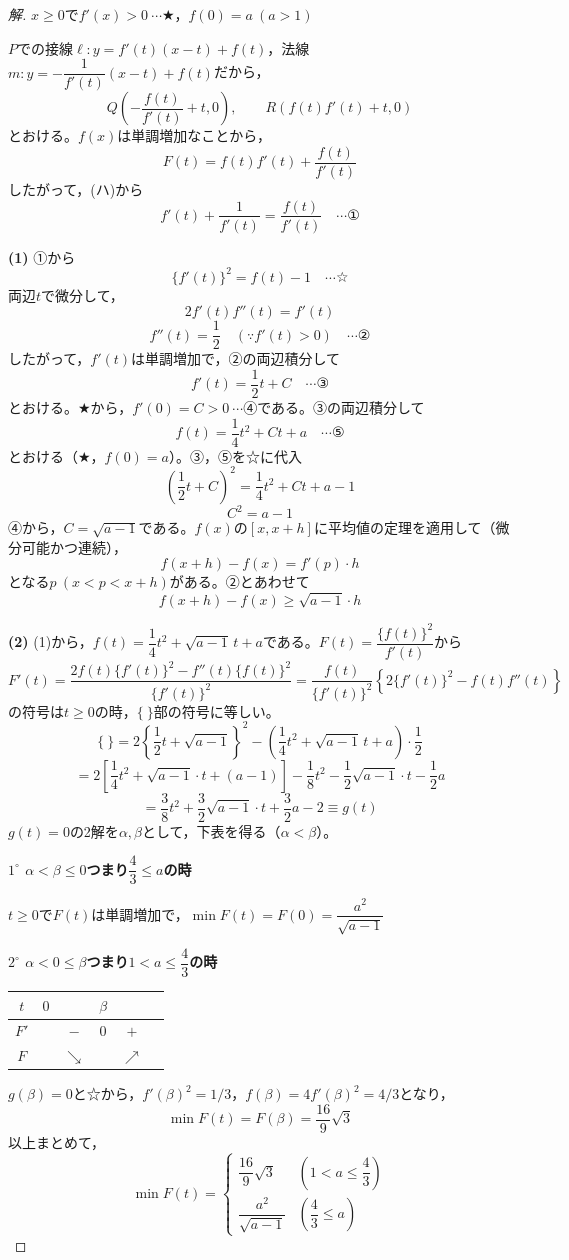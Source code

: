 \documentclass[../main.tex]{subfiles}
\begin{document}
\begin{proof}[解]
  $x\ge0$で$f'(x)>0\ \cdots\bigstar$，$f(0)=a\ (a>1)$

  $P$での接線$\ell: y=f'(t)(x-t)+f(t)$，法線$m: y=-\dfrac1{f'(t)}(x-t)+f(t)$だから，
  \[
    Q\left(-\frac{f(t)}{f'(t)}+t,0\right), \qquad R(f(t)f'(t)+t,0)
  \]
  とおける。$f(x)$は単調増加なことから，
  \[
    F(t)=f(t)f'(t)+\frac{f(t)}{f'(t)}
  \]
  したがって，(ハ)から
  \[
    f'(t)+\frac1{f'(t)}=\frac{f(t)}{f'(t)} \quad\cdots\text{①}
  \]

  \textbf{(1)} ①から
  \[
    \{f'(t)\}^2=f(t)-1 \quad\cdots\text{☆}
  \]
  両辺$t$で微分して，
  \[
    2f'(t)f''(t)=f'(t)
  \]
  \[
    f''(t)=\frac12 \quad(\because f'(t)>0) \quad\cdots\text{②}
  \]
  したがって，$f'(t)$は単調増加で，②の両辺積分して
  \[
    f'(t)=\frac12t+C \quad\cdots\text{③}
  \]
  とおける。$\bigstar$から，$f'(0)=C>0\ \cdots$④である。③の両辺積分して
  \[
    f(t)=\frac14t^2+Ct+a \quad\cdots\text{⑤}
  \]
  とおける（$\bigstar$，$f(0)=a$）。③，⑤を☆に代入
  \[
    \left(\frac12t+C\right)^2=\frac14t^2+Ct+a-1
  \]
  \[
    C^2=a-1
  \]
  ④から，$C=\sqrt{a-1}$である。$f(x)$の$[x,x+h]$に平均値の定理を適用して（微分可能かつ連続），
  \[
    f(x+h)-f(x)=f'(p)\cdot h
  \]
  となる$p\ (x<p<x+h)$がある。②とあわせて
  \[
    f(x+h)-f(x)\ge\sqrt{a-1}\cdot h
  \]

  \textbf{(2)} (1)から，$f(t)=\dfrac14t^2+\sqrt{a-1}\,t+a$である。$F(t)=\dfrac{\{f(t)\}^2}{f'(t)}$から
  \[
    F'(t)=\frac{2f(t)\{f'(t)\}^2-f''(t)\{f(t)\}^2}{\{f'(t)\}^2}=\frac{f(t)}{\{f'(t)\}^2}\left\{2\{f'(t)\}^2-f(t)f''(t)\right\}
  \]
  の符号は$t\ge0$の時，$\{\ \}$部の符号に等しい。
  \[
    \{\ \}=2\left\{\frac12t+\sqrt{a-1}\right\}^2-\left(\frac14t^2+\sqrt{a-1}\,t+a\right)\cdot\frac12
  \]
  \[
    =2\left[\frac14t^2+\sqrt{a-1}\cdot t+(a-1)\right]-\frac18t^2-\frac12\sqrt{a-1}\cdot t-\frac12a
  \]
  \[
    =\frac38t^2+\frac32\sqrt{a-1}\cdot t+\frac32a-2\equiv g(t)
  \]
  $g(t)=0$の2解を$\alpha,\beta$として，下表を得る（$\alpha<\beta$）。

  \textbf{$1^\circ$ $\alpha<\beta\le0$つまり$\dfrac43\le a$の時}

  $t\ge0$で$F(t)$は単調増加で，$\min F(t)=F(0)=\dfrac{a^2}{\sqrt{a-1}}$

  \textbf{$2^\circ$ $\alpha<0\le\beta$つまり$1<a\le\dfrac43$の時}
  \begin{center}
    \begin{tabular}{c|ccccc}
      $t$ & $0$ & & $\beta$ & & \\
      \hline
      $F'$ & & $-$ & $0$ & $+$ & \\
      \hline
      $F$ & & $\searrow$ & & $\nearrow$ &
    \end{tabular}
  \end{center}
  $g(\beta)=0$と☆から，$f'(\beta)^2=1/3$，$f(\beta)=4f'(\beta)^2=4/3$となり，
  \[
    \min F(t)=F(\beta)=\frac{16}9\sqrt3
  \]
  以上まとめて，
  \[
    \min F(t)=
    \begin{cases}
      \dfrac{16}9\sqrt3 & \left(1<a\le\dfrac43\right) \\
      \dfrac{a^2}{\sqrt{a-1}} & \left(\dfrac43\le a\right)
    \end{cases}
  \]
\end{proof}
\end{document}
